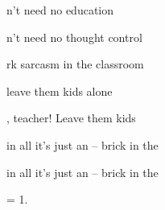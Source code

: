 

\zs
{}n’t need no education

n’t need no thought control

rk sarcasm in the classroom

 leave them kids alone 
\ks

\zr
{}, teacher! Leave them kids           

 in all it's just an --  brick in the 

 in all it's just an --  brick in the 
\kr

\zs
= 1.
\ks

\zr
\kr

\kp





